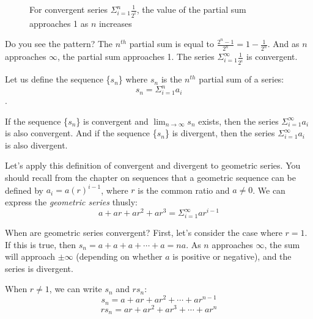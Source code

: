 \begin{figure}[htbp]
\centering
    \caption{For convergent series $\Sigma_{i=1}^n \frac{1}{2^i}$, 
    the value of the partial sum approaches 1 as $n$ increases}
    \label{fig:convsum}
\end{figure}

Do you see the pattern? The $n^{th}$ partial sum is equal to 
$\frac{2^n - 1}{2^n} = 1 - \frac{1}{2^n}$. And as $n$ approaches 
$\infty$, the partial sum approaches 1. The series $\Sigma_{i=1}^\infty 
\frac{1}{2^i}$ is convergent. 

Let us define the sequence \{$s_n$\} where $s_n$ is the $n^{th}$ 
partial sum of a series:
$$s_n = \Sigma_{i=1}^n a_i$$. 

If the sequence \{$s_n$\} is convergent and $\lim_{n \to \infty} s_n$ 
exists, then the series $\Sigma_{i=1}^\infty a_i$ is also convergent. 
And if the sequence \{$s_n$\} is divergent, then the series 
$\Sigma_{i=1}^\infty a_i$ is also divergent.

Let's apply this definition of convergent and divergent to geometric 
series. You should recall from the chapter on sequences that a 
geometric sequence can be defined by $a_i = a(r)^{i-1}$, where $r$ 
is the common ratio and $a \neq 0$. We can express the 
\textit{geometric series} thusly:
$$a + ar + ar^2 + ar^3 = \Sigma_{i=1}^\infty ar^{i-1}$$

When are geometric series convergent? First, let's consider the case 
where $r=1$. If this is true, then $s_n = a + a + a + \cdots + a = 
na$. As $n$ approaches $\infty$, the sum will approach $\pm \infty$ 
(depending on whether $a$ is positive or negative), and the series is 
divergent. 

When $r \neq 1$, we can write $s_n$ and $rs_n$:
$$s_n = a + ar + ar^2 + \cdots + ar^{n-1}$$
$$rs_n = ar + ar^2 + ar^3 + \cdots + ar^n$$

